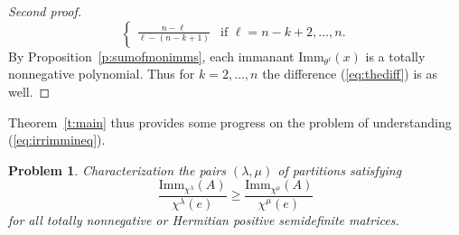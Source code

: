 \documentclass[12pt]{amsart}
\newtheorem{prob}[thm]{Problem}
\numberwithin{equation}{section}
\newcommand{\imm}[1]{\mathrm{Imm}_{#1}}
\newcommand{\sumsb}[1]{\sum_{\substack{#1}}}  %
\newcommand{\ntksp}{\negthickspace}
\newcommand{\nTksp}{\negthickspace\negthickspace}
\newcommand{\bp}{\begin{prob}}
\newcommand{\ep}{\end{prob}}
\begin{document}
\begin{proof}[Second proof]
\begin{equation*}
\begin{cases}
            \frac{n-\ell}{\ell-(n-k+1)} &\text{if $\ell = n-k+2, \dotsc, n$}.
        \end{cases}
    \end{equation*}
    By Proposition~\ref{p:sumofmonimms}, each immanant $\imm{\theta^\ell}(x)$
    is a totally nonnegative polynomial.
    Thus for $k = 2,\dotsc, n$
    the difference (\ref{eq:thediff}) is as well.
\end{proof}
Theorem~\ref{t:main} thus provides some progress on the problem
of understanding (\ref{eq:irrimmineq}).
\bp
Characterization the pairs $(\lambda,\mu)$
of partitions satisfying
\begin{equation}\label{eq:irrimmineq2}
  \frac{\imm{\chi^\lambda}(A)}{\chi^\lambda(e)}
  \geq
  \frac{\imm{\chi^\mu}(A)}{\chi^\mu(e)}
\end{equation}
for all totally nonnegative
or Hermitian positive semidefinite matrices.
\ep
\end{document}
